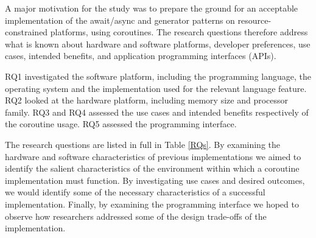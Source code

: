 \documentclass[format=acmsmall, review=false, screen=false]{acmart}
\begin{document}
A major motivation for the study was to prepare the ground for an acceptable implementation of the await/async and generator patterns on resource-constrained platforms, using coroutines. The research questions therefore address what is known about hardware and software platforms, developer preferences, use cases, intended benefits, and application programming interfaces (APIs).

RQ1 investigated the software platform, including the programming language, the operating system and the implementation used for the relevant language feature. RQ2 looked at the hardware platform, including memory size and processor family. RQ3 and RQ4 assessed the use cases and intended benefits respectively of the coroutine usage. RQ5 assessed the programming interface.

The research questions are listed in full in Table \ref{RQs}. By examining the hardware and software characteristics of previous implementations we aimed to identify the salient characteristics of the environment within which a coroutine implementation must function. By investigating use cases and desired outcomes, we would identify some of the necessary characteristics of a successful implementation. Finally, by examining the programming interface we hoped to observe how researchers addressed some of the design trade-offs of the implementation.
\end{document}
